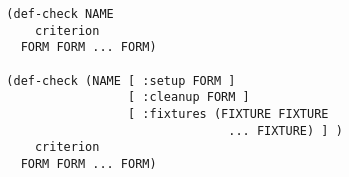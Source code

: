 \begin{verbatim}
  (def-check NAME
      criterion
    FORM FORM ... FORM)

  (def-check (NAME [ :setup FORM ]
                   [ :cleanup FORM ]
                   [ :fixtures (FIXTURE FIXTURE
                                 ... FIXTURE) ] )
      criterion
    FORM FORM ... FORM)
\end{verbatim}
